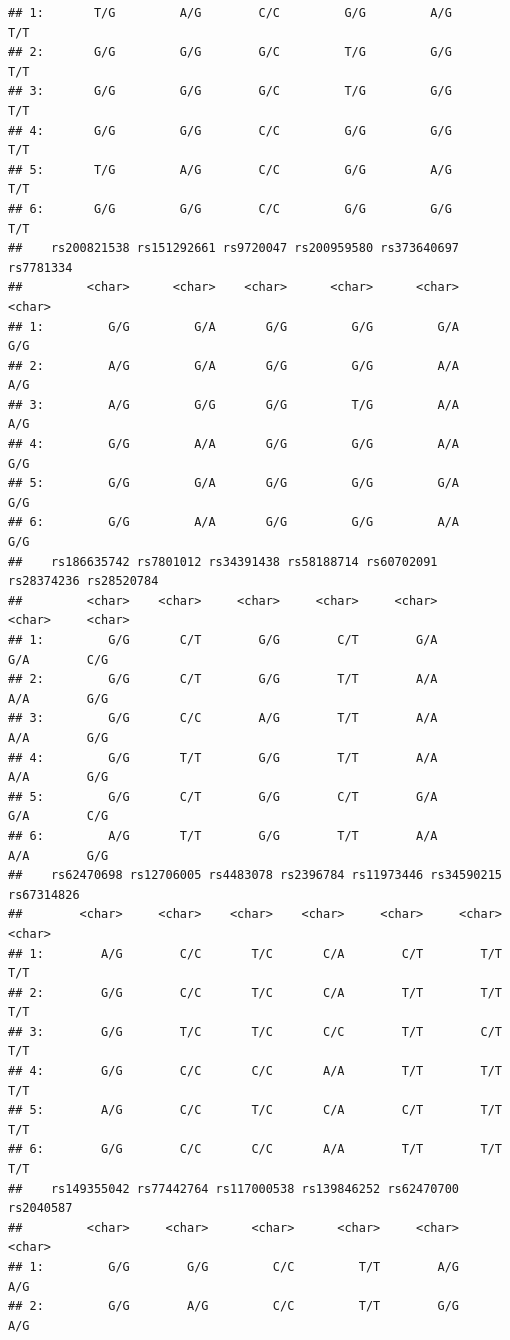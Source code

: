\documentclass[
]{article}
\begin{document}
\begin{verbatim}
## 1:       T/G         A/G        C/C         G/G         A/G         T/T
## 2:       G/G         G/G        G/C         T/G         G/G         T/T
## 3:       G/G         G/G        G/C         T/G         G/G         T/T
## 4:       G/G         G/G        C/C         G/G         G/G         T/T
## 5:       T/G         A/G        C/C         G/G         A/G         T/T
## 6:       G/G         G/G        C/C         G/G         G/G         T/T
##    rs200821538 rs151292661 rs9720047 rs200959580 rs373640697 rs7781334
##         <char>      <char>    <char>      <char>      <char>    <char>
## 1:         G/G         G/A       G/G         G/G         G/A       G/G
## 2:         A/G         G/A       G/G         G/G         A/A       A/G
## 3:         A/G         G/G       G/G         T/G         A/A       A/G
## 4:         G/G         A/A       G/G         G/G         A/A       G/G
## 5:         G/G         G/A       G/G         G/G         G/A       G/G
## 6:         G/G         A/A       G/G         G/G         A/A       G/G
##    rs186635742 rs7801012 rs34391438 rs58188714 rs60702091 rs28374236 rs28520784
##         <char>    <char>     <char>     <char>     <char>     <char>     <char>
## 1:         G/G       C/T        G/G        C/T        G/A        G/A        C/G
## 2:         G/G       C/T        G/G        T/T        A/A        A/A        G/G
## 3:         G/G       C/C        A/G        T/T        A/A        A/A        G/G
## 4:         G/G       T/T        G/G        T/T        A/A        A/A        G/G
## 5:         G/G       C/T        G/G        C/T        G/A        G/A        C/G
## 6:         A/G       T/T        G/G        T/T        A/A        A/A        G/G
##    rs62470698 rs12706005 rs4483078 rs2396784 rs11973446 rs34590215 rs67314826
##        <char>     <char>    <char>    <char>     <char>     <char>     <char>
## 1:        A/G        C/C       T/C       C/A        C/T        T/T        T/T
## 2:        G/G        C/C       T/C       C/A        T/T        T/T        T/T
## 3:        G/G        T/C       T/C       C/C        T/T        C/T        T/T
## 4:        G/G        C/C       C/C       A/A        T/T        T/T        T/T
## 5:        A/G        C/C       T/C       C/A        C/T        T/T        T/T
## 6:        G/G        C/C       C/C       A/A        T/T        T/T        T/T
##    rs149355042 rs77442764 rs117000538 rs139846252 rs62470700 rs2040587
##         <char>     <char>      <char>      <char>     <char>    <char>
## 1:         G/G        G/G         C/C         T/T        A/G       A/G
## 2:         G/G        A/G         C/C         T/T        G/G       A/G

\end{verbatim}
\end{document}
